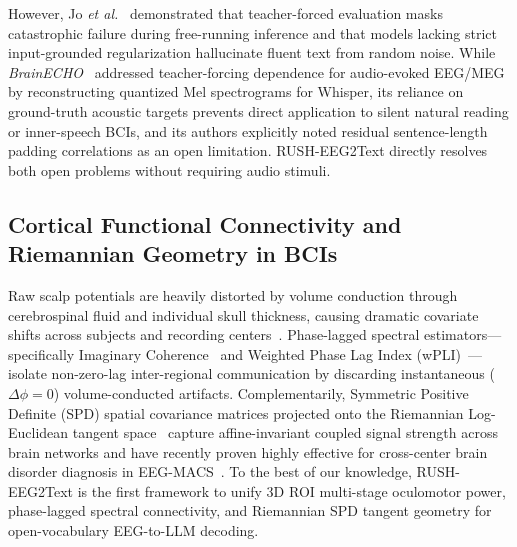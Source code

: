 \documentclass[journal]{IEEEtran}
\begin{document}
However, Jo \textit{et al.}~\cite{jo2024are} demonstrated that teacher-forced evaluation masks catastrophic failure during free-running inference and that models lacking strict input-grounded regularization hallucinate fluent text from random noise. While \textit{BrainECHO}~\cite{li2025brainecho} addressed teacher-forcing dependence for audio-evoked EEG/MEG by reconstructing quantized Mel spectrograms for Whisper, its reliance on ground-truth acoustic targets prevents direct application to silent natural reading or inner-speech BCIs, and its authors explicitly noted residual sentence-length padding correlations as an open limitation. RUSH-EEG2Text directly resolves both open problems without requiring audio stimuli.

\subsection{Cortical Functional Connectivity and Riemannian Geometry in BCIs}
Raw scalp potentials are heavily distorted by volume conduction through cerebrospinal fluid and individual skull thickness, causing dramatic covariate shifts across subjects and recording centers~\cite{song2024eegmacs}. Phase-lagged spectral estimators---specifically Imaginary Coherence~\cite{nolte2004icoh} and Weighted Phase Lag Index (wPLI)~\cite{vinck2011wpli}---isolate non-zero-lag inter-regional communication by discarding instantaneous ($\Delta\phi = 0$) volume-conducted artifacts. Complementarily, Symmetric Positive Definite (SPD) spatial covariance matrices projected onto the Riemannian Log-Euclidean tangent space~\cite{arsigny2006logeuclidean, barachant2013riemannian} capture affine-invariant coupled signal strength across brain networks and have recently proven highly effective for cross-center brain disorder diagnosis in EEG-MACS~\cite{song2024eegmacs}. To the best of our knowledge, RUSH-EEG2Text is the first framework to unify 3D ROI multi-stage oculomotor power, phase-lagged spectral connectivity, and Riemannian SPD tangent geometry for open-vocabulary EEG-to-LLM decoding.
\end{document}
